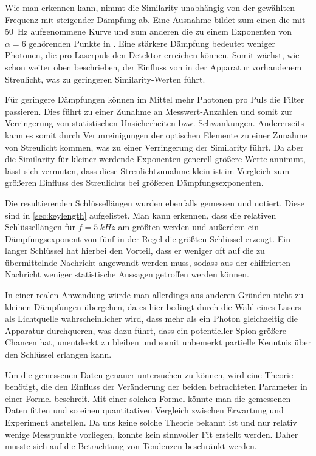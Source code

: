 Wie man erkennen kann, nimmt die Similarity unabhängig von der gewählten
Frequenz mit steigender Dämpfung ab. Eine Ausnahme bildet zum einen die mit
\SI{50}{Hz} aufgenommene Kurve und zum anderen die zu einem Exponenten von $α=6$
gehörenden Punkte in . Eine stärkere Dämpfung bedeutet weniger
Photonen, die pro Laserpuls den Detektor erreichen können. Somit wächst, wie
schon weiter oben beschrieben, der Einfluss von in der Apparatur vorhandenem
Streulicht, was zu geringeren Similarity-Werten führt.

Für geringere Dämpfungen können im Mittel mehr Photonen pro Puls die Filter
passieren. Dies führt zu einer Zunahme an Messwert-Anzahlen und somit zur
Verringerung von statistischen Unsicherheiten bzw. Schwankungen. Andererseits
kann es somit durch Verunreinigungen der optischen Elemente zu einer Zunahme
von Streulicht kommen, was zu einer Verringerung der Similarity führt. Da aber
die Similarity für kleiner werdende Exponenten generell größere Werte annimmt,
lässt sich vermuten, dass diese Streulichtzunahme klein ist im Vergleich zum
größeren Einfluss des Streulichts bei größeren Dämpfungsexponenten.

Die resultierenden Schlüssellängen wurden ebenfalls gemessen und notiert. Diese
sind in \ref{sec:keylength} aufgelistet. Man kann erkennen, dass die relativen 
Schlüssellängen für $f=\SI{5}{kHz}$ am größten werden und außerdem ein
Dämpfungsexponent von fünf in der Regel die größten Schlüssel erzeugt. Ein
langer Schlüssel hat hierbei den Vorteil, dass er weniger oft auf die zu
übermittelnde Nachricht angewandt werden muss, sodass aus der chiffrierten
Nachricht weniger statistische Aussagen getroffen werden können.

In einer realen Anwendung würde man allerdings aus anderen Gründen nicht zu
kleinen Dämpfungen übergehen, da es hier bedingt durch die Wahl
eines Lasers als Lichtquelle wahrscheinlicher wird, dass mehr als ein Photon
gleichzeitig die Apparatur durchqueren, was dazu führt, dass ein potentieller
Spion größere Chancen hat, unentdeckt zu bleiben und somit unbemerkt partielle
Kenntnis über den Schlüssel erlangen kann.

Um die gemessenen Daten genauer untersuchen zu können, wird eine Theorie
benötigt, die den Einfluss der Veränderung der beiden betrachteten Parameter in
einer Formel beschreit. Mit einer solchen Formel könnte man die gemessenen
Daten fitten und so einen quantitativen Vergleich zwischen Erwartung und
Experiment anstellen. Da uns keine solche Theorie bekannt ist und nur relativ
wenige Messpunkte vorliegen, konnte kein sinnvoller Fit erstellt werden. Daher
musste sich auf die Betrachtung von Tendenzen beschränkt werden.

